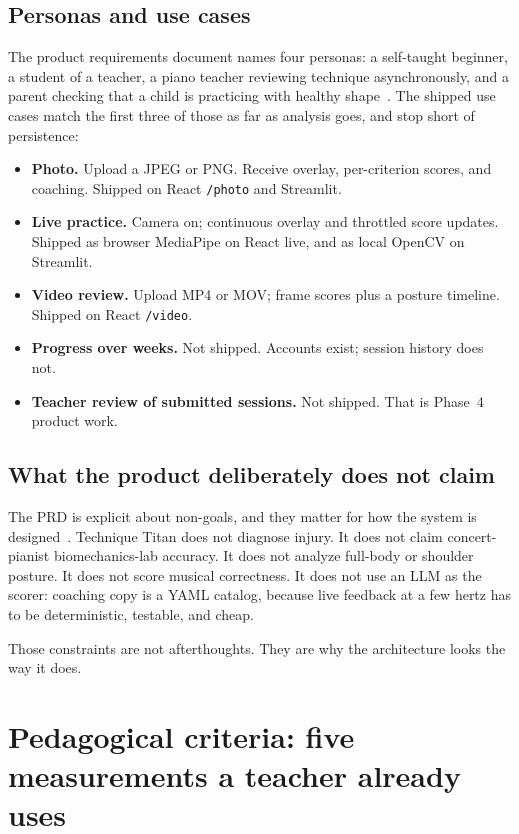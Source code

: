 \documentclass[11pt,a4paper]{article}
\newcommand{\code}[1]{\texttt{#1}}
\begin{document}
\subsection{Personas and use cases}

The product requirements document names four personas: a self-taught beginner, a student of a teacher, a piano teacher reviewing technique asynchronously, and a parent checking that a child is practicing with healthy shape~\cite{prd}.
The shipped use cases match the first three of those as far as analysis goes, and stop short of persistence:

\begin{itemize}
  \item \textbf{Photo.} Upload a JPEG or PNG. Receive overlay, per-criterion scores, and coaching. Shipped on React \code{/photo} and Streamlit.
  \item \textbf{Live practice.} Camera on; continuous overlay and throttled score updates. Shipped as browser MediaPipe on React live, and as local OpenCV on Streamlit.
  \item \textbf{Video review.} Upload MP4 or MOV; frame scores plus a posture timeline. Shipped on React \code{/video}.
  \item \textbf{Progress over weeks.} Not shipped. Accounts exist; session history does not.
  \item \textbf{Teacher review of submitted sessions.} Not shipped. That is Phase~4 product work.
\end{itemize}

\subsection{What the product deliberately does not claim}

The PRD is explicit about non-goals, and they matter for how the system is designed~\cite{prd}.
Technique Titan does not diagnose injury.
It does not claim concert-pianist biomechanics-lab accuracy.
It does not analyze full-body or shoulder posture.
It does not score musical correctness.
It does not use an LLM as the scorer: coaching copy is a YAML catalog, because live feedback at a few hertz has to be deterministic, testable, and cheap.

Those constraints are not afterthoughts.
They are why the architecture looks the way it does.

\section{Pedagogical criteria: five measurements a teacher already uses}
\end{document}
